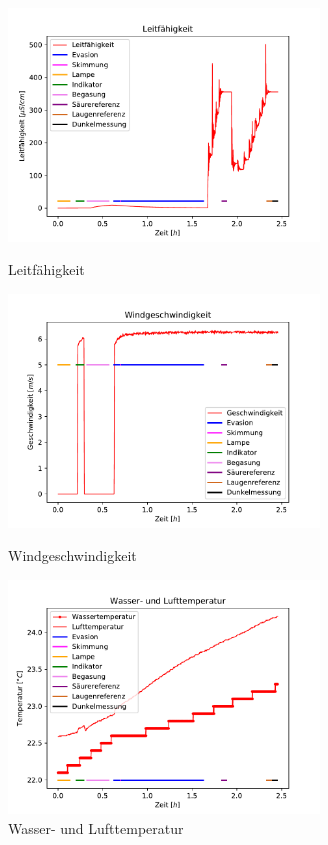 \documentclass[12pt]{article}
\begin{document}
\begin{figure}[H]
	\centering
	\parbox{82.5mm}{
		\centering
		\includegraphics[width=82.5mm]{VE-Wasser/Leitfaehigkeit}
		\caption{Leitf\"ahigkeit \label{fig: VE-Wasser}}
	}
	\hfill%
	\parbox{82.5mm}{
		\centering
		\includegraphics[width=82.5mm]{VE-Wasser/Windgeschwindigkeit}
		\caption{Windgeschwindigkeit}
	}
	\centering
	\parbox{82.5mm}{
		\centering
		\includegraphics[width=82.5mm]{VE-Wasser/Wassertemperatur}
		\caption{Wasser- und Lufttemperatur}
	}
	\hfill%

\end{figure}
\end{document}
